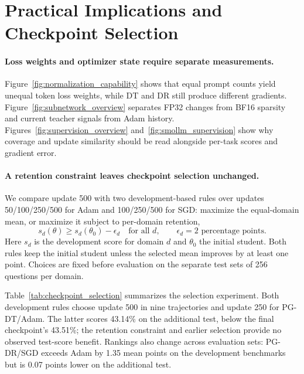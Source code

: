 \section{Practical Implications and Checkpoint Selection}
\label{sec:recipe}

\paragraph{Loss weights and optimizer state require separate measurements.}
Figure~\ref{fig:normalization_capability} shows that equal prompt counts yield unequal token loss weights, while DT and DR still produce different gradients. Figure~\ref{fig:subnetwork_overview} separates FP32 changes from BF16 sparsity and current teacher signals from Adam history. Figures~\ref{fig:supervision_overview} and~\ref{fig:smollm_supervision} show why coverage and update similarity should be read alongside per-task scores and gradient error.

\paragraph{A retention constraint leaves checkpoint selection unchanged.}
We compare update 500 with two development-based rules over updates 50/100/250/500 for Adam and 100/250/500 for SGD: maximize the equal-domain mean, or maximize it subject to per-domain retention,
\begin{equation}
s_d(\theta)\geq s_d(\theta_0)-\epsilon_d\quad\text{for all }d,
\qquad \epsilon_d=2\text{ percentage points}.
\label{eq:retention}
\end{equation}
Here $s_d$ is the development score for domain $d$ and $\theta_0$ the initial student. Both rules keep the initial student unless the selected mean improves by at least one point. Choices are fixed before evaluation on the separate test sets of 256 questions per domain.

Table~\ref{tab:checkpoint_selection} summarizes the selection experiment. Both development rules choose update 500 in nine trajectories and update 250 for PG-DT/Adam. The latter scores 43.14\% on the additional test, below the final checkpoint's 43.51\%; the retention constraint and earlier selection provide no observed test-score benefit. Rankings also change across evaluation sets: PG-DR/SGD exceeds Adam by 1.35 mean points on the development benchmarks but is 0.07 points lower on the additional test.


